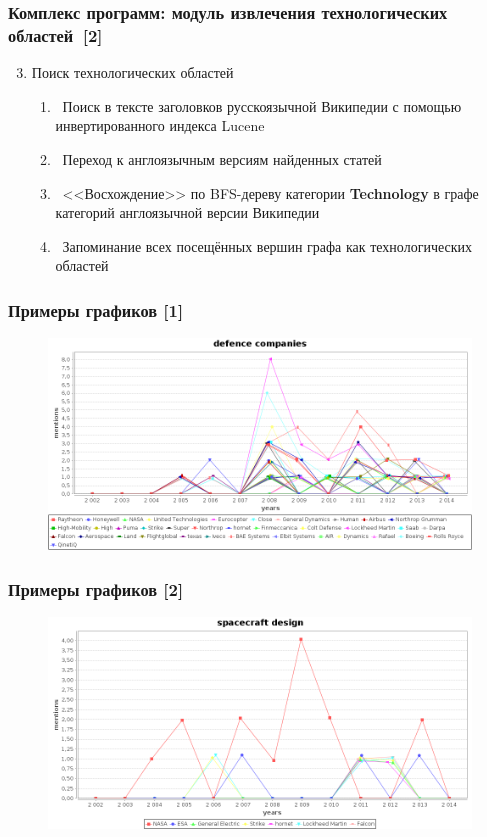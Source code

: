 \documentclass{beamer}
\begin{document}
\begin{frame}\frametitle{Комплекс программ: модуль извлечения технологических областей~[2]}
\begin{enumerate}
         \setcounter{enumi}{2}
        \item Поиск технологических областей
        \begin{enumerate} 
		\item ~Поиск в тексте заголовков русскоязычной Википедии с помощью инвертированного индекса Lucene
		\item ~Переход к англоязычным версиям найденных статей
		\item ~<<Восхождение>> по BFS-дереву категории \textbf{Technology} в графе категорий англоязычной версии Википедии
		 \item ~Запоминание всех посещённых вершин графа как технологических областей
        \end{enumerate}
\end{enumerate}

\end{frame}

\begin{frame}\frametitle{Примеры графиков [1]}
\begin{figure}[ht]
\begin{center}
\includegraphics[width=4.5in]{war.png}
\end{center}
\end{figure}
\end{frame}

\begin{frame}\frametitle{Примеры графиков [2]}
\begin{figure}[ht]
\begin{center}
\includegraphics[width=4.5in]{space.png}
\end{center}
\end{figure}
\end{frame}
\end{document}
